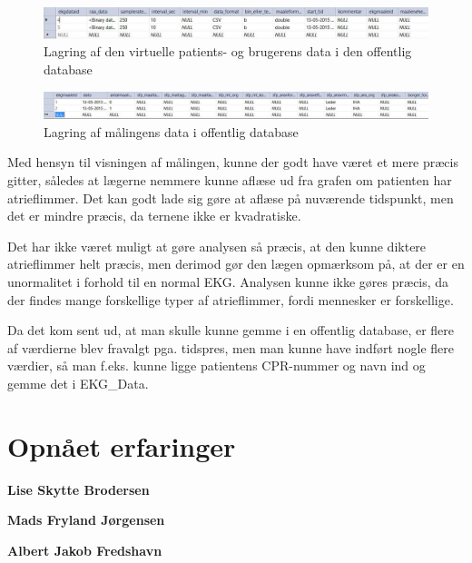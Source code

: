 \begin{figure}[H]
	\centering
	\includegraphics[width=1\textwidth]{Figurer/Snip20150525_28}
	\caption{Lagring af den virtuelle patients- og brugerens data i den offentlig database}
\end{figure}

\begin{figure}[H]
	\centering
	\includegraphics[width=1\textwidth]{Figurer/Snip20150525_29}
	\caption{Lagring af målingens data i offentlig database}
\end{figure}

Med hensyn til visningen af målingen, kunne der godt have været et mere præcis gitter, således at lægerne nemmere kunne aflæse ud fra grafen om patienten har atrieflimmer. Det kan godt lade sig gøre at aflæse på nuværende tidspunkt, men det er mindre præcis, da ternene ikke er kvadratiske.

Det har ikke været muligt at gøre analysen så præcis, at den kunne diktere atrieflimmer helt præcis, men derimod gør den lægen opmærksom på, at der er en unormalitet i forhold til en normal EKG. Analysen kunne ikke gøres præcis, da der findes mange forskellige typer af atrieflimmer, fordi mennesker er forskellige.

Da det kom sent ud, at man skulle kunne gemme i en offentlig database, er flere af værdierne blev fravalgt pga. tidspres, men man kunne have indført nogle flere værdier, så man f.eks. kunne ligge patientens CPR-nummer og navn ind og gemme det i EKG\_Data.


\section{Opnået erfaringer}
\textbf{Lise Skytte Brodersen}

\textbf{Mads Fryland Jørgensen}

\textbf{Albert Jakob Fredshavn}


